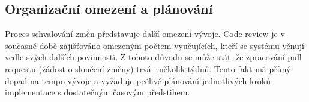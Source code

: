\subsection{Organizační omezení a plánování}
\label{subsec:kelvin-development-organization}

Proces schvalování změn představuje další omezení vývoje.
Code review je v současné době zajišťováno omezeným počtem vyučujících, kteří se systému věnují vedle svých dalších povinností.
Z tohoto důvodu se může stát, že zpracování pull requestu (žádost o sloučení změny) trvá i několik týdnů.
Tento fakt má přímý dopad na tempo vývoje a vyžaduje pečlivé plánování jednotlivých kroků implementace s dostatečným časovým předstihem.

\endinput

